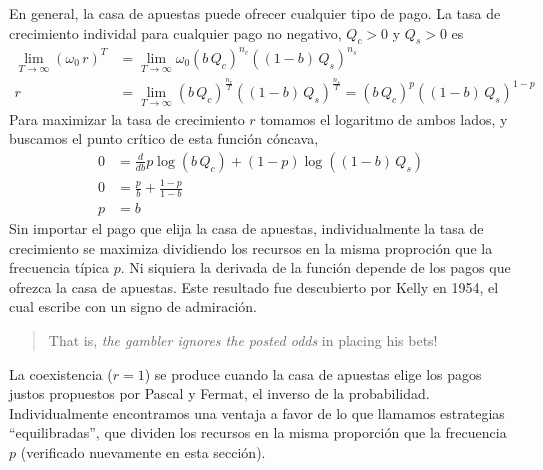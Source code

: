 \documentclass[a4paper,10pt]{book}
\theoremstyle{definition}
\begin{document}

En general, la casa de apuestas puede ofrecer cualquier tipo de pago.
%
La tasa de crecimiento individal para cualquier pago no negativo, $Q_c > 0$ y $Q_s > 0$ es
%
\begin{equation}
\begin{split}
\lim_{T \rightarrow \infty } (\omega_0 \, r)^T &= \lim_{T \rightarrow \infty } \omega_0 (b \, Q_c)^{n_c} ((1-b) \, Q_s )^{n_s} \\
r &= \lim_{T \rightarrow \infty } (b \, Q_c)^{\frac{n_c}{T}} ((1-b) \, Q_s )^{\frac{n_s}{T}} = (b \, Q_c)^{p} ((1-b) \, Q_s )^{1-p}
\end{split}
\end{equation}
%
Para maximizar la tasa de crecimiento $r$ tomamos el logaritmo de ambos lados, y buscamos el punto cr\'itico de esta funci\'on c\'oncava,
%
\begin{equation}
\begin{split}
0 &= \frac{d}{db} p \log (b \, Q_c) + (1-p) \log ((1-b) \, Q_s) \\
0 &= \frac{p}{b} + \frac{1-p}{1-b} \\
p &= b 
\end{split}
\end{equation}
%
Sin importar el pago que elija la casa de apuestas, individualmente la tasa de crecimiento se maximiza dividiendo los recursos en la misma proproci\'on que la frecuencia t\'ipica $p$.
%
Ni siquiera la derivada de la funci\'on depende de los pagos que ofrezca la casa de apuestas.
%
Este resultado fue descubierto por Kelly en 1954, el cual escribe con un signo de admiraci\'on.
%
\begin{quotation}
That is, \emph{the gambler ignores the posted odds} in placing his bets!
\end{quotation}
%
La coexistencia ($r=1$) se produce cuando la casa de apuestas elige los pagos justos propuestos por Pascal y Fermat, el inverso de la probabilidad.
%
Individualmente encontramos una ventaja a favor de lo que llamamos estrategias ``equilibradas'', que dividen los recursos en la misma proporci\'on que la frecuencia $p$ (verificado nuevamente en esta secci\'on).

\end{document}
